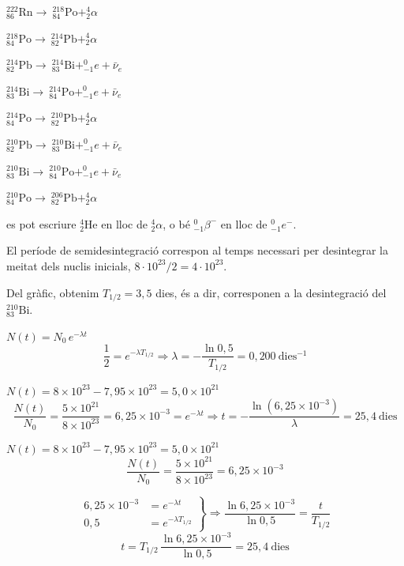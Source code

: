 \begin{solapartat}
 $^{222}_{86}\mathrm{Rn} \rightarrow\ ^{218}_{84}\mathrm{Po} + ^{4}_{2}\alpha$

 $^{218}_{84}\mathrm{Po} \rightarrow\ ^{214}_{82}\mathrm{Pb} + ^{4}_{2}\alpha$

 $^{214}_{82}\mathrm{Pb} \rightarrow\ ^{214}_{83}\mathrm{Bi} + ^{0}_{-1}e + \bar{\nu}_e$

 $^{214}_{83}\mathrm{Bi} \rightarrow\ ^{214}_{84}\mathrm{Po} + ^{0}_{-1}e + \bar{\nu}_e$

 $^{214}_{84}\mathrm{Po} \rightarrow\ ^{210}_{82}\mathrm{Pb} + ^{4}_{2}\alpha$

 $^{210}_{82}\mathrm{Pb} \rightarrow\ ^{210}_{83}\mathrm{Bi} + ^{0}_{-1}e + \bar{\nu}_e$

 $^{210}_{83}\mathrm{Bi} \rightarrow\ ^{210}_{84}\mathrm{Po} + ^{0}_{-1}e + \bar{\nu}_e$

 $^{210}_{84}\mathrm{Po} \rightarrow\ ^{206}_{82}\mathrm{Pb} + ^{4}_{2}\alpha$

 es pot escriure $^{4}_{2}\mathrm{He}$ en lloc de $^{4}_{2}\alpha$, o bé $^{0}_{-1}\beta^{-}$ en lloc de $^{0}_{-1}e^{-}$.
\end{solapartat}

\begin{solapartat}
 El període de semidesintegració correspon al temps necessari per desintegrar la meitat dels nuclis inicials, $8\cdot 10^{23}/2 = 4\cdot 10^{23}$.


Del gràfic, obtenim $T_{1/2} = 3,5$ dies, és a dir, corresponen a la desintegració del $^{210}_{83}\mathrm{Bi}$.

 $N(t) = N_0\,e^{-\lambda t}$
\[ \frac{1}{2} = e^{-\lambda T_{1/2}} \Rightarrow \lambda = -\frac{\ln 0,5}{T_{1/2}} = 0,200\ \mathrm{dies^{-1}} \]

 $N(t) = 8\times 10^{23} - 7,95\times 10^{23} = 5,0\times 10^{21}$
\[ \frac{N(t)}{N_0} = \frac{5\times 10^{21}}{8\times 10^{23}} = 6,25\times 10^{-3} = e^{-\lambda t} \Rightarrow t = -\frac{\ln(6,25\times 10^{-3})}{\lambda} = 25,4\ \text{dies} \]


 $N(t) = 8\times 10^{23} - 7,95\times 10^{23} = 5,0\times 10^{21}$
\[ \frac{N(t)}{N_0} = \frac{5\times 10^{21}}{8\times 10^{23}} = 6,25\times 10^{-3} \]

\[ \left.\begin{aligned} 6,25\times 10^{-3} &= e^{-\lambda t}\\ 0,5 &= e^{-\lambda T_{1/2}} \end{aligned}\right\} \Rightarrow \frac{\ln 6,25\times 10^{-3}}{\ln 0,5} = \frac{t}{T_{1/2}} \]
\[ t = T_{1/2}\,\frac{\ln 6,25\times 10^{-3}}{\ln 0,5} = 25,4\ \text{dies} \]
\end{solapartat}
